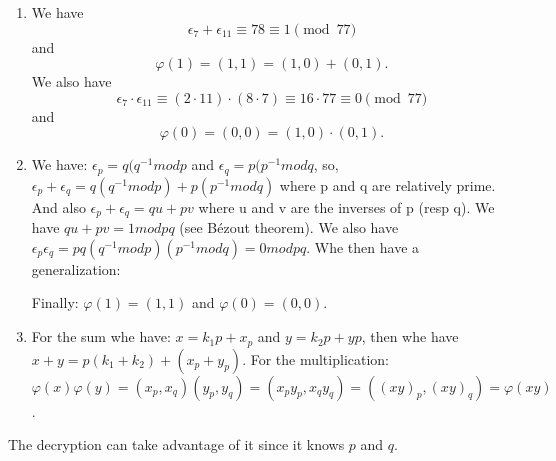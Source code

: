 \begin{solution}
  \begin{enumerate}
    \item
      We have
      \[ \epsilon_7 + \epsilon_{11} \equiv 78 \equiv 1 \pmod{77} \]
      and
      \[ \varphi(1) = (1,1) = (1,0) + (0,1). \]
      We also have
      \[ \epsilon_7 \cdot \epsilon_{11} \equiv (2 \cdot 11) \cdot (8 \cdot 7) \equiv 16 \cdot 77 \equiv 0 \pmod{77} \]
      and
      \[ \varphi(0) = (0,0) = (1,0) \cdot (0,1). \]
    \item           
      We have: $\epsilon_p = q(q^{-1} mod p$ and $\epsilon_q = p(p^{-1} mod q$, so, $\epsilon_p + \epsilon_q = q(q^{-1} mod p) + p(p^{-1} mod q)$ where p and q are relatively prime.
      And also $\epsilon_p + \epsilon_q = q u + p v$ where u and v are the inverses of p (resp q). We have $q u + p v = 1 mod pq$ (see Bézout theorem).
      We also have $\epsilon_p \epsilon_q = pq(q^{-1} mod p)(p^{-1} mod q) = 0 mod pq$. Whe then have a generalization:

      Finally: $\varphi(1) = (1, 1)$ and $\varphi(0) = (0, 0)$.

    \item
      For the sum whe have: $x = k_1 p + x_p$ and $y = k_2 p + yp$, then whe have $x + y = p(k_1 + k_2) + (x_p + y_p)$.
      For the multiplication: $\varphi(x)\varphi(y) = (x_p, x_q)(y_p, y_q) = (x_p y_p, x_qy_q) = ((xy)_p, (xy)_q) = \varphi(xy)$.

  \end{enumerate}
  The decryption can take advantage of it since it knows $p$ and $q$.
\end{solution}

